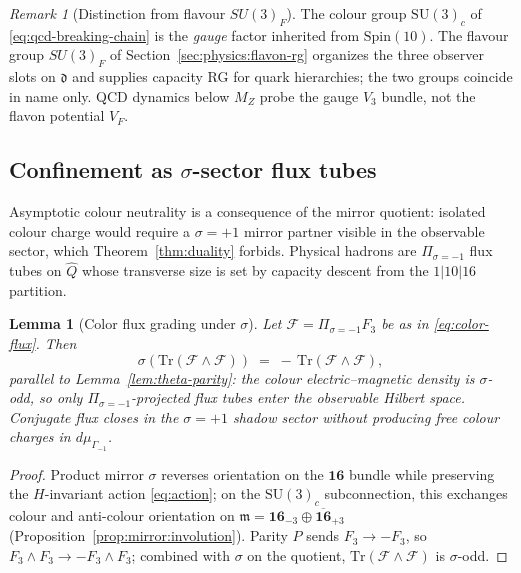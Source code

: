 \documentclass[aps,prd,onecolumn,amsmath,amssymb,nofootinbib,11pt]{revtex4-2}
\numberwithin{equation}{section}
\theoremstyle{plain}
\newtheorem{lemma}[theorem]{Lemma}
\theoremstyle{definition}
\theoremstyle{remark}
\newtheorem{remark}[theorem]{Remark}
\newcommand{\Spin}{\mathrm{Spin}}
\begin{document}
\begin{remark}[Distinction from flavour $SU(3)_F$]
The colour group $\mathrm{SU}(3)_c$ of \eqref{eq:qcd-breaking-chain} is the
\emph{gauge} factor inherited from $\Spin(10)$. The flavour group
$SU(3)_F$ of Section~\ref{sec:physics:flavon-rg} organizes the three observer
slots on $\mathfrak{d}$ and supplies capacity RG for quark hierarchies; the
two groups coincide in name only. QCD dynamics below $M_Z$ probe the gauge
$V_3$ bundle, not the flavon potential $V_F$.
\end{remark}

\subsection{Confinement as $\sigma$-sector flux tubes}
\label{sec:qcd:confinement}

Asymptotic colour neutrality is a consequence of the mirror quotient: isolated
colour charge would require a $\sigma=+1$ mirror partner visible in the
observable sector, which Theorem~\ref{thm:duality} forbids. Physical
hadrons are $\Pi_{\sigma=-1}$ flux tubes on $\hat Q$ whose transverse size
is set by capacity descent from the $1|10|16$ partition.

\begin{lemma}[Color flux grading under $\sigma$]
\label{lem:color-flux-sigma}
Let $\mathcal{F}=\Pi_{\sigma=-1}F_3$ be as in \eqref{eq:color-flux}. Then
\begin{equation}\label{eq:flux-sigma-odd}
  \sigma(\mathrm{Tr}(\mathcal{F}\wedge\mathcal{F}))
  \;=\;
  -\,\mathrm{Tr}(\mathcal{F}\wedge\mathcal{F}),
\end{equation}
parallel to Lemma~\ref{lem:theta-parity}: the colour electric--magnetic
density is $\sigma$-odd, so only $\Pi_{\sigma=-1}$-projected flux tubes
enter the observable Hilbert space. Conjugate flux closes in the
$\sigma=+1$ shadow sector without producing free colour charges in
$d\mu_{\Gamma_{-1}}$.
\end{lemma}

\begin{proof}
Product mirror $\sigma$ reverses orientation on the $\mathbf{16}$
bundle while preserving the $H$-invariant action \eqref{eq:action}; on the
$\mathrm{SU}(3)_c$ subconnection, this exchanges colour and anti-colour
orientation on $\mathfrak{m}=\mathbf{16}_{-3}\oplus\overline{\mathbf{16}}_{+3}$
(Proposition~\ref{prop:mirror:involution}). Parity $P$ sends
$F_3\to -F_3$, so $F_3\wedge F_3\to -F_3\wedge F_3$; combined with
$\sigma$ on the quotient, $\mathrm{Tr}(\mathcal{F}\wedge\mathcal{F})$ is
$\sigma$-odd.
\end{proof}
\end{document}
